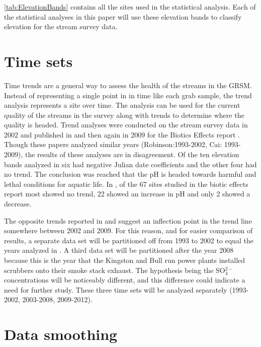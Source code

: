 \autoref{tab:ElevationBands} contains all the sites used in the statistical analysis.
Each of the statistical analyses in this paper will use these elevation bands to classify elevation for the stream survey data.

\section{Time sets}

Time trends are a general way to assess the health of the streams in the GRSM.
Instead of representing a single point in in time like each grab sample, the trend analysis represents a site over time.
The analysis can be used for the current quality of the streams in the survey along with trends to determine where the quality is headed. %
Trend analyses were conducted on the stream survey data in 2002 and published in \citet{robinson2008ph} and then again in 2009 for the Biotics Effects report \citep{cai2013}.
Though these papers analyzed similar years (Robinson:1993-2002, Cai: 1993-2009), the results of these analyses are in disagreement.
Of the ten elevation bands analyzed in \citet{robinson2008ph} six had negative Julian date coefficients and the other four had no trend.
The conclusion was reached that the pH is headed towards harmful and lethal conditions for aquatic life. 
In \citet{cai2013}, of the 67 sites studied in the biotic effects report most showed no trend, 22 showed an increase in pH and only 2 showed a decrease. 

The opposite trends reported in  \citet{robinson2008ph} and \citet{cai2013} suggest an inflection point in the trend line somewhere between 2002 and 2009. 
For this reason, and for easier comparison of results,  a separate data set will be partitioned off from 1993 to 2002 to equal the years analyzed in \citet{robinson2008ph}.  
A third data set will be partitioned after the year 2008 because this is the year that the Kingston and Bull run power plants installed scrubbers onto their smoke stack exhaust. 
The hypothesis being the SO$_4^{2-}$ concentrations will be noticeably different, and this difference could indicate a need for further study. 
These three time sets will be analyzed separately (1993-2002, 2003-2008, 2009-2012).

\section{Data smoothing}  \label{sec:smoothing}%

